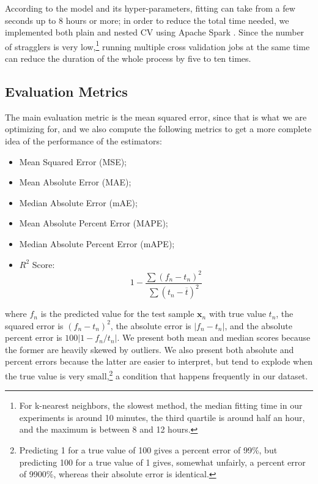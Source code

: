 \documentclass[a4paper,11pt]{kth-mag}
\begin{document}
According to the model and its hyper-parameters, fitting can take from a few seconds up to 8 hours or more; in order to reduce the total time needed, we implemented both plain and nested CV using Apache Spark \citep{spark}. Since the number of stragglers is very low,\footnote{For k-nearest neighbors, the slowest method, the median fitting time in our experiments is around 10 minutes, the third quartile is around half an hour, and the maximum is between 8 and 12 hours.} running multiple cross validation jobs at the same time can reduce the duration of the whole process by five to ten times.

\subsection{Evaluation Metrics}
The main evaluation metric is the mean squared error, since that is what we are optimizing for, and we also compute the following metrics to get a more complete idea of the performance of the estimators:

\begin{itemize}
\item Mean Squared Error (MSE);
\item Mean Absolute Error (MAE);
\item Median Absolute Error (mAE);
\item Mean Absolute Percent Error (MAPE);
\item Median Absolute Percent Error (mAPE);
\item $R^2$ Score:
$$
1-\frac{\sum (f_n-t_n)^2}{\sum (t_n-\overline{t})^2}
$$
\end{itemize}

\noindent where $f_n$ is the predicted value for the test sample $\bm x_n$ with true value $t_n$, the squared error is $(f_n-t_n)^2$, the absolute error is $\vert f_n-t_n\vert$, and the absolute percent error is $100\vert 1-f_n/t_n\vert$. We present both mean and median scores because the former are heavily skewed by outliers. We also present both absolute and percent errors because the latter are easier to interpret, but tend to explode when the true value is very small,\footnote{Predicting 1 for a true value of 100 gives a percent error of 99\%, but predicting 100 for a true value of 1 gives, somewhat unfairly, a percent error of 9900\%, whereas their absolute error is identical.} a condition that happens frequently in our dataset.
\end{document}
